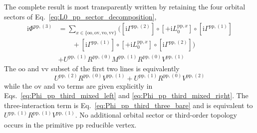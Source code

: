 \documentclass[aip,jcp,reprint,noshowkeys,superscriptaddress]{revtex4-1}
\newcommand{\ii}{\mathrm{i}}
\newcommand{\pp}{\text{pp}}
\begin{document}
The complete result is most transparently written by retaining the four
orbital sectors of Eq.~\eqref{eq:L0_pp_sector_decomposition},
\begin{equation}
    \begin{split}
    \ii\Phi^{\pp,(3)}
    &=
    \sum_{x\in\{\text{oo},\text{ov},\text{vo},\text{vv}\}}
    \Big(
    \left[\ii\Gamma^{\pp,(2)}\right]
    \circ\left[+\ii L_0^{\pp,x}\right]
    \circ\left[\ii\Gamma^{\pp,(1)}\right]
    \\
    &\qquad+
    \left[\ii\Gamma^{\pp,(1)}\right]
    \circ\left[+\ii L_0^{\pp,x}\right]
    \circ\left[\ii\Gamma^{\pp,(2)}\right]
    \Big)
    \\
    &+
    U^{\pp,(1)}R^{\pp,(0)}M^{\pp,(1)}R^{\pp,(0)}V^{\pp,(1)}
    \end{split}
    \label{eq:Phi_pp_third_final}
\end{equation}
The $\text{oo}$ and $\text{vv}$ subset of the first two lines is equivalently
\begin{equation}
    U^{\pp,(2)}R^{\pp,(0)}V^{\pp,(1)}
    +
    U^{\pp,(1)}R^{\pp,(0)}V^{\pp,(2)}
    \label{eq:Phi_pp_third_oovv_resolvent}
\end{equation}
while the $\text{ov}$ and $\text{vo}$ terms are given explicitly in
Eqs.~\eqref{eq:Phi_pp_third_mixed_left} and
\eqref{eq:Phi_pp_third_mixed_right}.
The three-interaction term is Eq.~\eqref{eq:Phi_pp_third_three_bare} and is
equivalent to $U^{\pp,(1)}R^{\pp,(1)}V^{\pp,(1)}$.
No additional orbital sector or third-order topology occurs in the primitive
$\pp$ reducible vertex.



\end{document}

